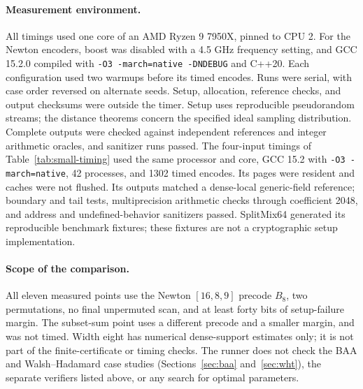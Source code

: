 \paragraph{Measurement environment.}
All timings used one core of an AMD Ryzen 9 7950X, pinned to CPU 2.
For the Newton encoders, boost was disabled with a 4.5 GHz frequency
setting, and GCC 15.2.0 compiled with \texttt{-O3 -march=native
-DNDEBUG} and C++20. Each configuration used two warmups before its
timed encodes. Runs were serial, with case order reversed on alternate
seeds. Setup, allocation, reference checks, and output checksums were
outside the timer. Setup uses reproducible pseudorandom streams; the
distance theorems concern the specified ideal sampling distribution.
Complete outputs were checked against independent references and
integer arithmetic oracles, and sanitizer runs passed. The four-input
timings of Table~\ref{tab:small-timing} used the same processor and
core, GCC 15.2 with \texttt{-O3 -march=native}, 42 processes, and 1302
timed encodes. Its pages were resident and caches were not flushed.
Its outputs matched a dense-local generic-field reference; boundary and
tail tests, multiprecision arithmetic checks through coefficient 2048,
and address and undefined-behavior sanitizers passed. SplitMix64
generated its reproducible benchmark fixtures; these fixtures are not a
cryptographic setup implementation.

\paragraph{Scope of the comparison.}
All eleven measured points use the Newton $[16,8,9]$ precode $B_8$,
two permutations, no final unpermuted scan, and at least forty bits of
setup-failure margin. The subset-sum point uses a different precode and
a smaller margin, and was not timed. Width eight has numerical
dense-support estimates only; it is not part of the finite-certificate
or timing checks. The runner does not check the BAA and Walsh--Hadamard
case studies (Sections~\ref{sec:baa} and~\ref{sec:wht}), the separate
verifiers listed above, or any search for optimal parameters.
